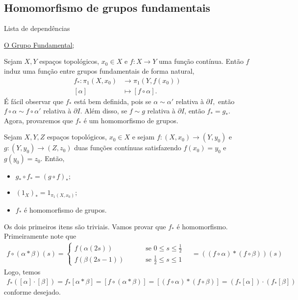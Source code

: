 \subsection{Homomorfismo de grupos fundamentais}
\label{hom-grupo-fundamental}
\begin{titlemize}{Lista de dependências}
	\item \hyperref[grupo-fundamental-def]{O Grupo Fundamental};\\ %
\end{titlemize}
Sejam $X,Y$ espaços topológicos, $x_0\in X$ e $f:X\rightarrow Y$ uma função contínua. Então $f$ induz uma função entre grupos fundamentais de forma natural,
\begin{align*}
    f_*:\pi_1(X,x_0)&\longrightarrow\pi_1(Y,f(x_0))\\
    [\alpha]&\longmapsto [f\circ \alpha].
\end{align*}
É fácil observar que $f_*$ está bem definida, pois se $\alpha\sim \alpha'$ relativa à $\partial I,$ então $f\circ \alpha\sim f\circ \alpha'$ relativa à $\partial I$. Além disso, se $f\sim g$ relativa à $\partial I$, então $f_*=g_*$. Agora, provaremos que $f_*$ é um homomorfismo de grupos.
\begin{prop}
    Sejam $X,Y,Z$ espaços topológicos, $x_0\in X$ e sejam $f:(X,x_0)\rightarrow (Y,y_0)$ e $g:(Y,y_0)\rightarrow (Z,z_0)$ duas funções contínuas satisfazendo $f(x_0)=y_0$ e $g(y_0)=z_0.$ Então, 
    \begin{itemize}
        \item $g_*\circ f_*=(g\circ f)_*;$
        \item $(1_X)_*=1_{\pi_1(X,x_0)};$
        \item $f_*$ é homomorfismo de grupos.
    \end{itemize}
\end{prop}
    
\begin{dem}
    Os dois primeiros itens são triviais. Vamos provar que $f_*$ é homomorfismo. Primeiramente note que 
    \begin{align*}
        f\circ (\alpha*\beta)(s)=\begin{cases}
            f(\alpha(2s))&\qquad\mbox{ se }0\le s\le \frac{1}{2}\\
            f(\beta(2s-1))&\qquad\mbox{ se }\frac{1}{2}\le s\le 1
        \end{cases}\quad= ((f\circ\alpha)*(f\circ \beta))(s)
    \end{align*}
    Logo, temos
    \begin{align*}
        f_*([\alpha]\cdot [\beta])=f_*[\alpha*\beta]=[f\circ (\alpha*\beta)]=[(f\circ\alpha)*(f\circ\beta)]=(f_*[\alpha])\cdot (f_*[\beta])
    \end{align*}
    conforme desejado.
\end{dem}

